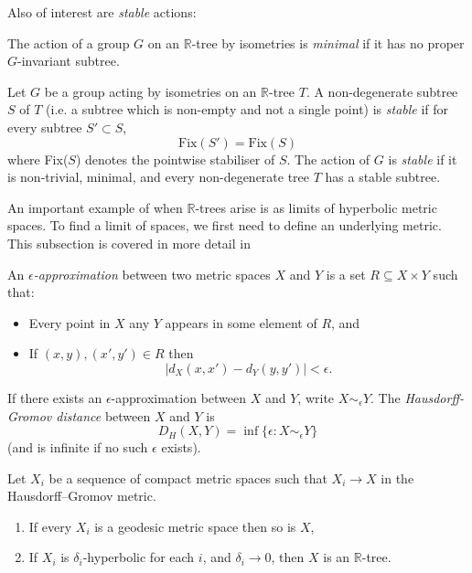 Also of interest are \textit{stable} actions:
\begin{definition}
    The action of a group $G$ on an $\mathbb{R}$-tree by isometries is \emph{minimal} if it has no proper $G$-invariant subtree.
\end{definition}

\begin{definition}
    Let $G$ be a group acting by isometries on an $\mathbb{R}$-tree $T$. A  non-degenerate subtree $S$ of $T$ (i.e. a subtree which is non-empty and not a single point) is \emph{stable} if for every subtree $S'\subset S$, \[\text{Fix}(S')=\text{Fix}(S)\] where Fix($S$) denotes the pointwise stabiliser of $S$. The action of $G$ is \emph{stable} if it is non-trivial, minimal, and every non-degenerate tree $T$ has a stable subtree.
\end{definition}

An important example of when $\mathbb{R}$-trees arise is as limits of hyperbolic metric spaces. To find a limit of spaces, we first need to define an underlying metric. This subsection is covered in more detail in \cite{BridsonSwarup}

\begin{definition}
    An $\epsilon$\emph{-approximation} between two metric spaces $X$ and $Y$ is a set $R\subseteq X\times Y$ such that:
    \begin{itemize}
        \item Every point in $X$ any $Y$ appears in some element of $R$, and
        \item If $(x,y),(x',y')\in R$ then \[\lvert d_X(x,x')-d_Y(y,y')\rvert<\epsilon.\]
    \end{itemize}
    If there exists an $\epsilon$-approximation between $X$ and $Y$, write $X\sim_\epsilon Y$. The \emph{Hausdorff-Gromov distance} between $X$ and $Y$ is \[D_H(X,Y)=\inf\{\epsilon:X\sim_\epsilon Y\}\] (and is infinite if no such $\epsilon$ exists).
\end{definition}

\begin{theorem}\label{limittrees}
    Let $X_i$ be a sequence of compact metric spaces such that $X_i\rightarrow X$ in the Hausdorff--Gromov metric.
    \begin{enumerate}
        \item If every $X_i$ is a geodesic metric space then so is $X$,
        \item If $X_i$ is $\delta_i$-hyperbolic for each $i$, and $\delta_i\rightarrow 0$, then $X$ is an $\mathbb{R}$-tree. 
    \end{enumerate}
\end{theorem}

